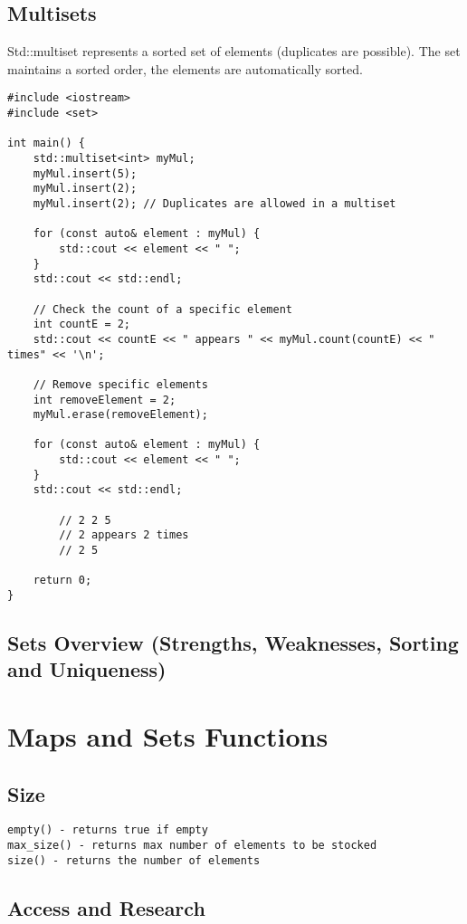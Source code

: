 \subsection{Multisets}

Std::multiset represents a sorted set of elements (duplicates are possible). The set maintains a sorted order,
the elements are automatically sorted.

\begin{verbatim}
#include <iostream>
#include <set>

int main() {
    std::multiset<int> myMul;
    myMul.insert(5);
    myMul.insert(2);
    myMul.insert(2); // Duplicates are allowed in a multiset

    for (const auto& element : myMul) {
        std::cout << element << " ";
    }
    std::cout << std::endl;

    // Check the count of a specific element
    int countE = 2;
    std::cout << countE << " appears " << myMul.count(countE) << " times" << '\n';

    // Remove specific elements
    int removeElement = 2;
    myMul.erase(removeElement);

    for (const auto& element : myMul) {
        std::cout << element << " ";
    }
    std::cout << std::endl;

        // 2 2 5
        // 2 appears 2 times
        // 2 5 

    return 0;
}
\end{verbatim}

\subsection{Sets Overview (Strengths, Weaknesses, Sorting and Uniqueness)}

\section{Maps and Sets Functions}

\subsection{Size}

\begin{verbatim}
empty() - returns true if empty
max_size() - returns max number of elements to be stocked
size() - returns the number of elements
\end{verbatim}


\subsection{Access and Research}

